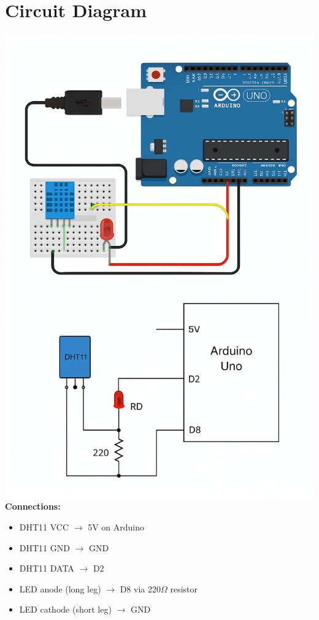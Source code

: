 \documentclass[11pt]{article}
\begin{document}
\section*{Circuit Diagram}
\vspace{0.5cm}
\includegraphics[width=\textwidth]{circuit_diagram_dht11_led.png}
\newline
\textbf{Connections:}
\begin{itemize}
    \item DHT11 VCC $\rightarrow$ 5V on Arduino
    \item DHT11 GND $\rightarrow$ GND
    \item DHT11 DATA $\rightarrow$ D2
    \item LED anode (long leg) $\rightarrow$ D8 via 220$\Omega$ resistor
    \item LED cathode (short leg) $\rightarrow$ GND
\end{itemize}
\end{document}
